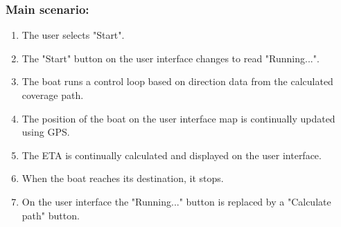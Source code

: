\begin{framed}
	\subsubsection*{Main scenario:}
	\begin{enumerate}
		\item The user selects "Start".
		\item The "Start" button on the user interface changes to read "Running...".
		\item The boat runs a control loop based on direction data from the calculated coverage path.
		\item The position of the boat on the user interface map is continually updated using GPS.
		\item The ETA is continually calculated and displayed on the user interface.
		\item When the boat reaches its destination, it stops.
		\item On the user interface the "Running..." button is replaced by a "Calculate path" button.
	\end{enumerate}	
\end{framed}	

